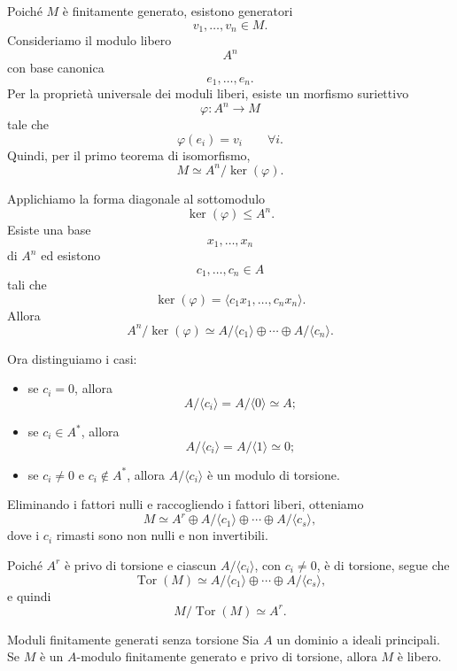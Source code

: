 \documentclass[a4paper]{article}
\begin{document}
\begin{radioactive}
\begin{snippetproof}{}
    Poiché \(M\) è finitamente generato, esistono generatori
    \[
        v_1,\ldots,v_n\in M.
    \]
    Consideriamo il modulo libero
    \[
        A^n
    \]
    con base canonica
    \[
        e_1,\ldots,e_n.
    \]
    Per la proprietà universale dei moduli liberi, esiste un morfismo suriettivo
    \[
        \varphi\colon A^n\to M
    \]
    tale che
    \[
        \varphi(e_i)=v_i
        \qquad
        \forall i.
    \]
    Quindi, per il primo teorema di isomorfismo,
    \[
        M\simeq A^n/\ker(\varphi).
    \]

    Applichiamo la forma diagonale al sottomodulo
    \[
        \ker(\varphi)\leq A^n.
    \]
    Esiste una base
    \[
        x_1,\ldots,x_n
    \]
    di \(A^n\) ed esistono
    \[
        c_1,\ldots,c_n\in A
    \]
    tali che
    \[
        \ker(\varphi)
        =
        \langle c_1x_1,\ldots,c_nx_n\rangle.
    \]
    Allora
    \[
        A^n/\ker(\varphi)
        \simeq
        A/\langle c_1 \rangle\oplus\cdots\oplus A/\langle c_n \rangle.
    \]

    Ora distinguiamo i casi:
    \begin{itemize}
        \item se \(c_i=0\), allora
        \[
            A/\langle c_i \rangle=A/\langle 0 \rangle\simeq A;
        \]
        \item se \(c_i\in A^\ast\), allora
        \[
            A/\langle c_i \rangle=A/\langle 1 \rangle\simeq 0;
        \]
        \item se \(c_i\neq 0\) e \(c_i\notin A^\ast\), allora \(A/\langle c_i \rangle\) è un modulo di torsione.
    \end{itemize}
    Eliminando i fattori nulli e raccogliendo i fattori liberi, otteniamo
    \[
        M\simeq A^r\oplus A/\langle c_1 \rangle\oplus\cdots\oplus A/\langle c_s \rangle,
    \]
    dove i \(c_i\) rimasti sono non nulli e non invertibili.

    Poiché \(A^r\) è privo di torsione e ciascun \(A/\langle c_i \rangle\), con \(c_i\neq 0\), è di torsione, segue che
    \[
        \operatorname{Tor}(M)\simeq A/\langle c_1 \rangle\oplus\cdots\oplus A/\langle c_s \rangle,
    \]
    e quindi
    \[
        M/\operatorname{Tor}(M)\simeq A^r.
    \]
\end{snippetproof}
\end{radioactive}

\begin{radioactive}
\begin{snippetcorollary}{Moduli finitamente generati senza torsione}
    Sia \(A\) un dominio a ideali principali.
    Se \(M\) è un \(A\)-modulo finitamente generato e privo di torsione, allora \(M\) è libero.
\end{snippetcorollary}
\end{radioactive}
\end{document}
